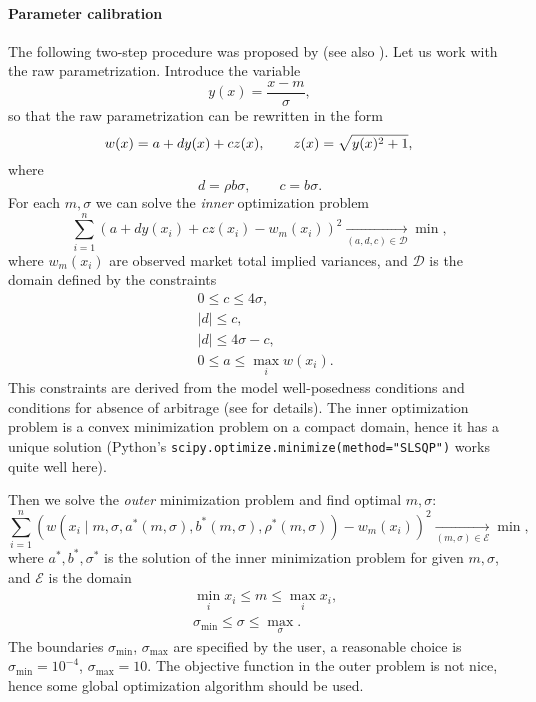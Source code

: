 \documentclass[a4paper,11pt,titlepage]{article}
\theoremstyle{remark}
\begin{document}
\paragraph{Parameter calibration} 
The following two-step procedure was proposed by \cite{Zeliade12} (see also
\cite{Aurell14}). Let us work with the raw parametrization. Introduce the
variable
\[
y(x) = \frac{x-m}{\sigma},
\]
so that the raw parametrization can be rewritten in the form
\[
w(x) = a + dy(x) + cz(x), \qquad z(x) =\sqrt{y(x)^2+1},\\
\]
where
\[
d=\rho b\sigma,\qquad c=b\sigma.
\]
For each $m,\sigma$ we can solve the \emph{inner} optimization problem
\[
\sum_{i=1}^n (a + d y(x_i) + c z(x_i) - w_m(x_i))^2 
\xrightarrow[(a,d,c)\in\mathcal{D}]{} \min,
\]
where $w_m(x_i)$ are observed market total implied variances, and $\mathcal{D}$
is the domain defined by the constraints
\begin{align*}
&0      \le c \le 4\sigma,\\
&|d|    \le c,\\
&|d|    \le 4\sigma-c,\\
&0\le a \le \max_i w(x_i).
\end{align*}
This constraints are derived from the model well-posedness conditions and
conditions for absence of arbitrage (see \cite{Aurell14} for details). The
inner optimization problem is a convex minimization problem on a compact
domain, hence it has a unique solution (Python's
\texttt{scipy.optimize.minimize(method="SLSQP")} works quite well here).

Then we solve the \emph{outer} minimization problem and find optimal
$m,\sigma$:
\[
\sum_{i=1}^n 
  ( w(x_i \mid m,\sigma, a^*(m,\sigma), b^*(m,\sigma), \rho^*(m,\sigma)) 
  - w_m(x_i) )^2
\xrightarrow[(m,\sigma)\in\mathcal{E}]{} \min,
\]
where $a^*,b^*,\sigma^*$ is the solution of the inner minimization problem for
given $m,\sigma$, and $\mathcal{E}$ is the domain
\begin{align*}
&\min_i x_i    \le m      \le \max_i x_i,\\
&\sigma_{\min} \le \sigma \le \max_\sigma.
\end{align*}
The boundaries $\sigma_{\min}$, $\sigma_{\max}$ are specified by the user, a
reasonable choice is $\sigma_{\min} = 10^{-4}$, $\sigma_{\max} = 10$. The
objective function in the outer problem is not nice, hence some global
optimization algorithm should be used.




\end{document}
